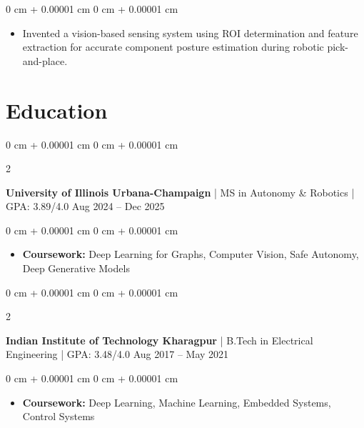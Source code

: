\documentclass[10pt, letterpaper]{article}
\newenvironment{highlights}{
    \begin{itemize}[
        topsep=0.10 cm,
        parsep=0.10 cm,
        partopsep=0pt,
        itemsep=0pt,
        leftmargin=0 cm + 10pt
    ]
}{
    \end{itemize}
} %
\newenvironment{onecolentry}{
    \begin{adjustwidth}{
        0 cm + 0.00001 cm
    }{
        0 cm + 0.00001 cm
    }
}{
    \end{adjustwidth}
} %
\newenvironment{twocolentry}[2][]{
    \onecolentry
    \def\secondColumn{#2}
    \setcolumnwidth{\fill, 4.5 cm}
    \begin{paracol}{2}
}{
    \switchcolumn \raggedleft \secondColumn
    \end{paracol}
    \endonecolentry
} %
\begin{document}
        \vspace{0.05 cm}
        \begin{onecolentry}
            \begin{highlights}
                \item Invented a vision-based sensing system using ROI determination and feature extraction for accurate component posture estimation during robotic pick-and-place.
            \end{highlights}
        \end{onecolentry}


    \section{Education}

        \begin{twocolentry}{Aug 2024 -- Dec 2025}
            {\textbf{University of Illinois Urbana-Champaign} | MS in Autonomy \& Robotics | GPA: 3.89/4.0}\end{twocolentry}

        \vspace{0.05 cm}
        \begin{onecolentry}
            \begin{highlights}
                \item \textbf{Coursework:} Deep Learning for Graphs, Computer Vision, Safe Autonomy, Deep Generative Models
            \end{highlights}
        \end{onecolentry}

        \vspace{0.05 cm}

        \begin{twocolentry}{Aug 2017 -- May 2021}
            \textbf{Indian Institute of Technology Kharagpur} | B.Tech in Electrical Engineering | GPA: 3.48/4.0\end{twocolentry}

        \vspace{0.05 cm}
        \begin{onecolentry}
            \begin{highlights}
                \item \textbf{Coursework:} Deep Learning, Machine Learning, Embedded Systems, Control Systems
            \end{highlights}
        \end{onecolentry}
\end{document}
